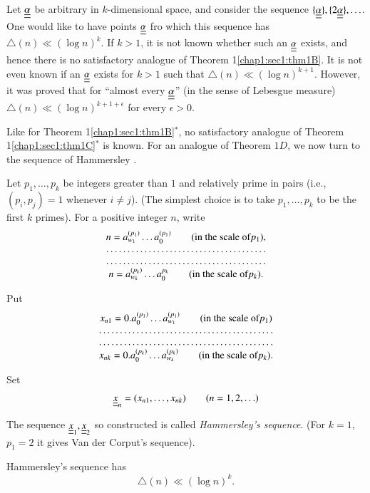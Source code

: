 Let $\underline{\underline{\alpha}}$ be arbitrary in $k$-dimensional space, and consider the sequence $\{\underline{\underline{\alpha}}\}, \{2\underline{\underline{\alpha}}\}, \ldots$. One would like to have points $\underline{\underline{\alpha}}$ fro which this sequence has $\triangle(n) \ll (\log n)^{k}$. If $k > 1$, it is not known whether such an $\underline{\underline{\alpha}}$ exists, and hence there is no satisfactory analogue of Theorem 1\ref{chap1:sec1:thm1B}. It is not even known if an $\underline{\underline{\alpha}}$ exists for $k > 1$ such that $\triangle(n) \ll (\log n)^{k+1}$. However, it was proved \cite{20} that for ``almost every $\underline{\underline{\alpha}}$'' (in the sense of Lebesgue measure) $\triangle(n) \ll (\log n)^{k+1+\epsilon}$ for every $\epsilon > 0$.

Like for Theorem 1\ref{chap1:sec1:thm1B}${^*}$, no satisfactory analogue of Theorem 1\ref{chap1:sec1:thm1C}$^{*}$ is known. For an analogue of Theorem $1D$, we now turn to the sequence of Hammersley \cite{7}.

Let $p_{1}, \ldots, p_{k}$ be integers greater than $1$ and relatively prime in pairs (i.e., $(p_{i}, p_{j}) = 1$ whenever $i \neq j$). (The simplest choice is to take $p_{1}, \ldots , p_{k}$ to be the first $k$ primes). For a positive integer $n$, write 
$$
\begin{matrix}
n = a_{w_{1}}^{(p_{1})} \ldots a_{0}^{(p_{1})}\qquad\text{(in the scale of} p_{1}),\\
\hdotsfor{1}\\
\hdotsfor{1}\\
n = a_{w_{k}}^{(p_{k})} \ldots a_{0}^{p_{k}}\qquad\text{(in the scale of} p_{k}).
\end{matrix}
$$

Put
$$
\begin{matrix}
x_{n1} = 0.a_{0}^{(p_{1})} \ldots a_{w_{1}}^{(p_{1})}\qquad\text{(in the scale of} p_{1})\\
\hdotsfor{1}\\
\hdotsfor{1}\\
x_{nk} = 0.a_{0}^{(p_{k})} \ldots a_{w_{k}}^{(p_{k})}\qquad\text{(in the scale of} p_{k}).
\end{matrix}
$$\pageoriginale

Set 
$$
\underline{\underline{x}}_{n} = (x_{n1}, \ldots, x_{nk})\qquad(n = 1, 2, \ldots)
$$

The sequence $\underline{\underline{x}}_{1}, \underline{\underline{x}}_{2}$ so constructed is called {\em
  Hammersley's seque\-nce}. (For $k = 1$, $p_{1} = 2$ it gives Van der
Corput's sequence). 

\begin{theorem}\label{chap1:sec1:thm1E}
\cite{6} Hammersley's sequence has
$$
\triangle(n) \ll (\log n)^{k}.
$$
\end{theorem}

